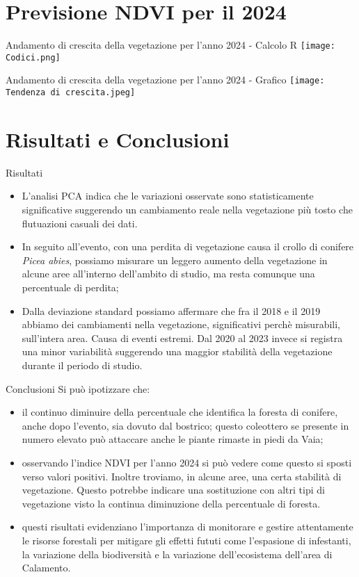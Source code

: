 \documentclass[10pt]{beamer}
\begin{document}
\section{Previsione NDVI per il 2024}
\begin{frame}{Andamento di crescita della vegetazione per l'anno 2024 - Calcolo R }
\centering
\texttt{[image: Codici.png]}
\end{frame}
\begin{frame}{Andamento di crescita della vegetazione per l'anno 2024 - Grafico}
\centering
\texttt{[image: Tendenza di crescita.jpeg]}
\end{frame}

\section{Risultati e Conclusioni}
\begin{frame}{Risultati}
\begin{itemize}
    \item L'analisi PCA indica che le variazioni osservate  sono statisticamente significative suggerendo un cambiamento reale nella vegetazione più tosto che flutuazioni casuali dei dati. 
    \item In seguito all'evento, con una perdita di vegetazione causa il crollo di conifere \textit{Picea abies}, possiamo misurare un leggero aumento della vegetazione in alcune aree all'interno dell'ambito di studio, ma resta comunque una percentuale di perdita;
    \item Dalla deviazione standard possiamo affermare che fra il 2018 e il 2019 abbiamo dei cambiamenti nella vegetazione, significativi perchè misurabili, sull'intera area. Causa di eventi estremi. Dal 2020 al 2023 invece si registra una minor variabilità suggerendo una maggior stabilità della vegetazione durante il periodo di studio.
\end{itemize}
\end{frame}

\begin{frame}{Conclusioni}
Si può ipotizzare che: 
\begin{itemize}
    \item il continuo diminuire della percentuale che identifica la foresta di conifere, anche dopo l'evento, sia dovuto dal bostrico; questo coleottero se presente in numero elevato può attaccare anche le piante rimaste in piedi da Vaia; 
     \item osservando l'indice NDVI per l'anno 2024 si può vedere come questo si sposti verso valori positivi. Inoltre troviamo, in alcune aree, una certa stabilità di vegetazione. Questo potrebbe indicare una sostituzione con altri tipi di vegetazione visto la continua diminuzione della percentuale di foresta.
     \item questi risultati evidenziano l'importanza di monitorare e gestire attentamente le risorse forestali per mitigare gli effetti fututi come l'espasione di infestanti, la variazione della biodiversità e la variazione dell'ecosistema dell'area di Calamento. 
\end{itemize} 
\end{frame}
\end{document}
